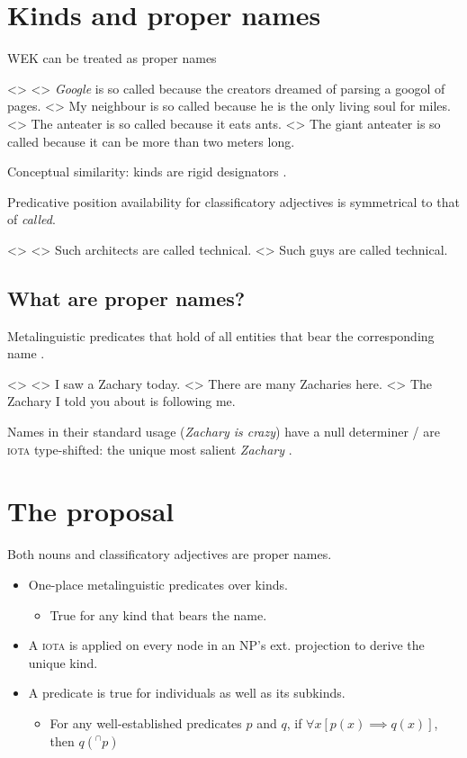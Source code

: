 \documentclass[a4paper,12pt]{article}
\begin{document}
\section{Kinds and proper names}\label{pn}

WEK can be treated as proper names \parencite{carlson1977referencekindsenglish,heyer1985genericdescriptionsdefault,krifka1995genericityintroduction}

\pex<>
    \a<> \textit{Google} is so called because the creators dreamed of parsing a googol of pages.
    \a<> \ljudge* My neighbour is so called because he is the only living soul for miles.
    \a<> The anteater is so called because it eats ants.
    \a<> The giant anteater is so called because it can be more than two meters long.
\xe

Conceptual similarity: kinds are rigid designators \parencite{krifka1995genericityintroduction}.

Predicative position availability for classificatory adjectives is symmetrical to that of \textit{called}.

\pex<>
\a<> Such architects are called technical.
\a<> \ljudge*Such guys are called technical.
\xe

\subsection{What are proper names?}

Metalinguistic predicates that hold of all entities that bear the corresponding name \parencite[a.m.o.]{burge1973referencepropernames}. 

\pex<>
    \a<> I saw a Zachary today.
    \a<> There are many Zacharies here.
    \a<> The Zachary I told you about is following me.
\xe

Names in their standard usage (\textit{Zachary is crazy}) have a null determiner / are \textsc{iota} type-shifted: the unique most salient \textit{Zachary} \parencite{elbourne2005situationsindividuals}.

\section{The proposal}

Both nouns and classificatory adjectives are proper names.

\begin{itemize}
    \item One-place metalinguistic predicates over kinds.
    \begin{itemize}
        \item True for any kind that bears the name.
    \end{itemize}
    \item A \textsc{iota} is applied on every node in an NP's ext. projection to derive the unique kind.
    \item A predicate is true for individuals as well as its subkinds.
    \begin{itemize}
        \item For any well-established predicates $p$ and $q$, if $\forall x[p(x)\implies q(x)]$, then $q(^\cap p)$
    \end{itemize}
\end{itemize}
\end{document}
